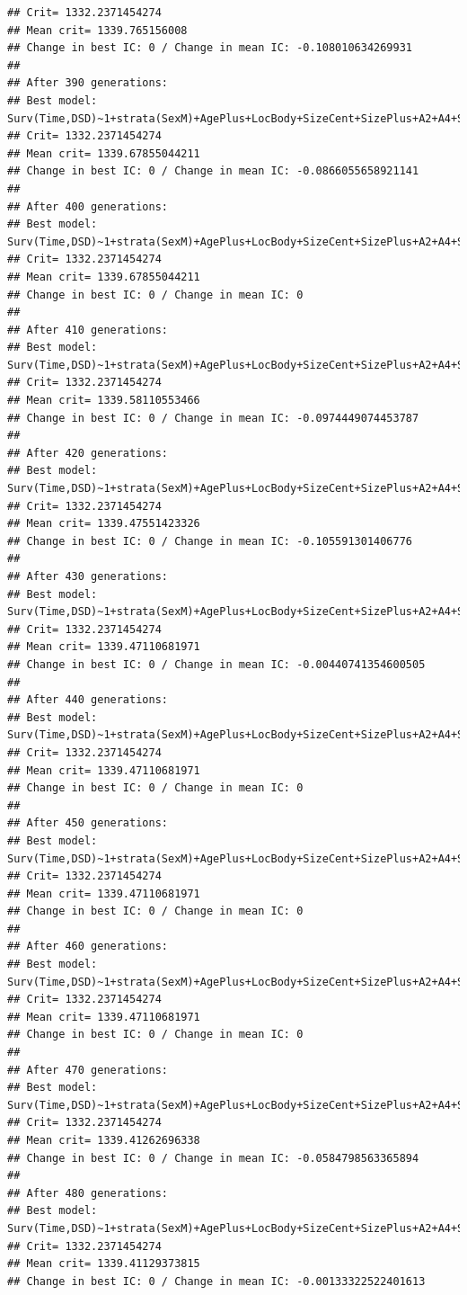 \documentclass{article}\usepackage[]{graphicx}\usepackage[]{color}
\makeatletter
\newenvironment{kframe}{%
 \def\at@end@of@kframe{}%
 \ifinner\ifhmode%
  \def\at@end@of@kframe{\end{minipage}}%
  \begin{minipage}{\columnwidth}%
 \fi\fi%
 \def\FrameCommand##1{\hskip\@totalleftmargin \hskip-\fboxsep
 \colorbox{shadecolor}{##1}\hskip-\fboxsep
     \hskip-\linewidth \hskip-\@totalleftmargin \hskip\columnwidth}%
 \MakeFramed {\advance\hsize-\width
   \@totalleftmargin\z@ \linewidth\hsize
   \@setminipage}}%
 {\par\unskip\endMakeFramed%
 \at@end@of@kframe}
\newenvironment{knitrout}{}{} %
\makeatother
\begin{document}
\begin{knitrout}
\begin{kframe}
\begin{verbatim}
## Crit= 1332.2371454274
## Mean crit= 1339.765156008
## Change in best IC: 0 / Change in mean IC: -0.108010634269931
## 
## After 390 generations:
## Best model: Surv(Time,DSD)~1+strata(SexM)+AgePlus+LocBody+SizeCent+SizePlus+A2+A4+SizeCent:LocBody+A2:SizeCent+strata(SexM):AgePlus+strata(SexM):SizePlus
## Crit= 1332.2371454274
## Mean crit= 1339.67855044211
## Change in best IC: 0 / Change in mean IC: -0.0866055658921141
## 
## After 400 generations:
## Best model: Surv(Time,DSD)~1+strata(SexM)+AgePlus+LocBody+SizeCent+SizePlus+A2+A4+SizeCent:LocBody+A2:SizeCent+strata(SexM):AgePlus+strata(SexM):SizePlus
## Crit= 1332.2371454274
## Mean crit= 1339.67855044211
## Change in best IC: 0 / Change in mean IC: 0
## 
## After 410 generations:
## Best model: Surv(Time,DSD)~1+strata(SexM)+AgePlus+LocBody+SizeCent+SizePlus+A2+A4+SizeCent:LocBody+A2:SizeCent+strata(SexM):AgePlus+strata(SexM):SizePlus
## Crit= 1332.2371454274
## Mean crit= 1339.58110553466
## Change in best IC: 0 / Change in mean IC: -0.0974449074453787
## 
## After 420 generations:
## Best model: Surv(Time,DSD)~1+strata(SexM)+AgePlus+LocBody+SizeCent+SizePlus+A2+A4+SizeCent:LocBody+A2:SizeCent+strata(SexM):AgePlus+strata(SexM):SizePlus
## Crit= 1332.2371454274
## Mean crit= 1339.47551423326
## Change in best IC: 0 / Change in mean IC: -0.105591301406776
## 
## After 430 generations:
## Best model: Surv(Time,DSD)~1+strata(SexM)+AgePlus+LocBody+SizeCent+SizePlus+A2+A4+SizeCent:LocBody+A2:SizeCent+strata(SexM):AgePlus+strata(SexM):SizePlus
## Crit= 1332.2371454274
## Mean crit= 1339.47110681971
## Change in best IC: 0 / Change in mean IC: -0.00440741354600505
## 
## After 440 generations:
## Best model: Surv(Time,DSD)~1+strata(SexM)+AgePlus+LocBody+SizeCent+SizePlus+A2+A4+SizeCent:LocBody+A2:SizeCent+strata(SexM):AgePlus+strata(SexM):SizePlus
## Crit= 1332.2371454274
## Mean crit= 1339.47110681971
## Change in best IC: 0 / Change in mean IC: 0
## 
## After 450 generations:
## Best model: Surv(Time,DSD)~1+strata(SexM)+AgePlus+LocBody+SizeCent+SizePlus+A2+A4+SizeCent:LocBody+A2:SizeCent+strata(SexM):AgePlus+strata(SexM):SizePlus
## Crit= 1332.2371454274
## Mean crit= 1339.47110681971
## Change in best IC: 0 / Change in mean IC: 0
## 
## After 460 generations:
## Best model: Surv(Time,DSD)~1+strata(SexM)+AgePlus+LocBody+SizeCent+SizePlus+A2+A4+SizeCent:LocBody+A2:SizeCent+strata(SexM):AgePlus+strata(SexM):SizePlus
## Crit= 1332.2371454274
## Mean crit= 1339.47110681971
## Change in best IC: 0 / Change in mean IC: 0
## 
## After 470 generations:
## Best model: Surv(Time,DSD)~1+strata(SexM)+AgePlus+LocBody+SizeCent+SizePlus+A2+A4+SizeCent:LocBody+A2:SizeCent+strata(SexM):AgePlus+strata(SexM):SizePlus
## Crit= 1332.2371454274
## Mean crit= 1339.41262696338
## Change in best IC: 0 / Change in mean IC: -0.0584798563365894
## 
## After 480 generations:
## Best model: Surv(Time,DSD)~1+strata(SexM)+AgePlus+LocBody+SizeCent+SizePlus+A2+A4+SizeCent:LocBody+A2:SizeCent+strata(SexM):AgePlus+strata(SexM):SizePlus
## Crit= 1332.2371454274
## Mean crit= 1339.41129373815
## Change in best IC: 0 / Change in mean IC: -0.00133322522401613
\end{verbatim}



\end{kframe}
\end{knitrout}
\end{document}
